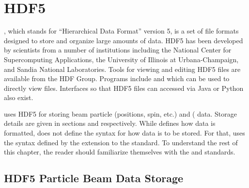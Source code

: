 \chapter{HDF5}
\label{c:hdf5}

, which stands for ``Hierarchical Data Format'' version 5\cite{b:hdf5}, is a set of file
formats designed to store and organize large amounts of data. HDF5 has been developed by scientists
from a number of institutions including the National Center for Supercomputing Applications, the
University of Illinois at Urbana-Champaign, and Sandia National Laboratories. Tools for viewing and
editing HDF5 files are available from the HDF Group\cite{b:hdf5}. Programs include  and
 which can be used to directly view files. Interfaces so that HDF5 files can accessed
via Java or Python also exist.

\bmad uses HDF5 for storing beam particle (positions, spin, etc.) and 
( data. Storage details are given in sections  and
 respectively. While  defines how data is formatted,  does not
define the syntax for how data is to be stored. For that, \bmad uses the syntax defined by the
 extension to the  standard\cite{b:openpmd}. To understand the rest of
this chapter, the reader should familiarize themselves with the  and 
standards.

\section{HDF5 Particle Beam Data Storage}
\label{s:hdf5.beam}

